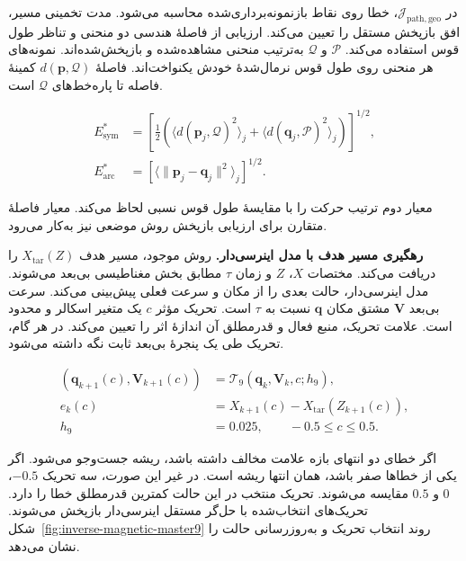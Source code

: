 در $\mathcal J_{\mathrm{path,geo}}$، خطا روی نقاط بازنمونه‌برداری‌شده محاسبه می‌شود.
مدت تخمینی مسیر، افق بازپخش مستقل را تعیین می‌کند.
ارزیابی از فاصلهٔ هندسی دو منحنی و تناظر طول قوس استفاده می‌کند.
$\mathcal P$ و $\mathcal Q$ به‌ترتیب منحنی مشاهده‌شده و بازپخش‌شده‌اند.
نمونه‌های هر منحنی روی طول قوس نرمال‌شدهٔ خودش یکنواخت‌اند.
فاصلهٔ $d(\mathbf p,\mathcal Q)$ کمینهٔ فاصله تا پاره‌خط‌های $\mathcal Q$ است.

\begin{equation}
\begin{aligned}
E_{\mathrm{sym}}^*
&=\left[
\tfrac12\left(
\langle d(\mathbf p_j,\mathcal Q)^2\rangle_j
+\langle d(\mathbf q_j,\mathcal P)^2\rangle_j
\right)\right]^{1/2},\\
E_{\mathrm{arc}}^*
&=\left[\langle\|\mathbf p_j-\mathbf q_j\|^2\rangle_j\right]^{1/2}.
\end{aligned}
\label{eq:inverse-flow-geometry-errors}
\end{equation}

معیار دوم ترتیب حرکت را با مقایسهٔ طول قوس نسبی لحاظ می‌کند.
معیار فاصلهٔ متقارن برای ارزیابی بازپخش روش موضعی نیز به‌کار می‌رود.

\label{sec:inverse-magnetic-drive}

\textbf{رهگیری مسیر هدف با مدل اینرسی‌دار.}
روش موجود، مسیر هدف $X_{\mathrm{tar}}(Z)$ را دریافت می‌کند.
مختصات $X$، $Z$ و زمان $\tau$ مطابق بخش مغناطیسی بی‌بعد می‌شوند.
مدل اینرسی‌دار، حالت بعدی را از مکان و سرعت فعلی پیش‌بینی می‌کند.
سرعت بی‌بعد $\mathbf V$ مشتق مکان $\mathbf q$ نسبت به $\tau$ است.
تحریک مؤثر $c$ یک متغیر اسکالر و محدود است.
علامت تحریک، منبع فعال و قدرمطلق آن اندازهٔ اثر را تعیین می‌کند.
در هر گام، تحریک طی یک پنجرهٔ بی‌بعد ثابت نگه داشته می‌شود.

\begin{equation}
\begin{aligned}
(\mathbf q_{k+1}(c),\mathbf V_{k+1}(c))
&=\mathcal T_9(\mathbf q_k,\mathbf V_k,c;h_9),\\
e_k(c)&=X_{k+1}(c)-X_{\mathrm{tar}}(Z_{k+1}(c)),\\
h_9&=0.025,\qquad -0.5\le c\le0.5 .
\end{aligned}
\label{eq:inverse-master9-tracking}
\end{equation}

اگر خطای دو انتهای بازه علامت مخالف داشته باشد، ریشه جست‌وجو می‌شود.
اگر یکی از خطاها صفر باشد، همان انتها ریشه است.
در غیر این صورت، سه تحریک $-0.5$، $0$ و $0.5$ مقایسه می‌شوند.
تحریک منتخب در این حالت کمترین قدرمطلق خطا را دارد.
تحریک‌های انتخاب‌شده با حل‌گر مستقل اینرسی‌دار  بازپخش می‌شوند.
شکل~\ref{fig:inverse-magnetic-master9} روند انتخاب تحریک و به‌روزرسانی حالت را نشان می‌دهد.

